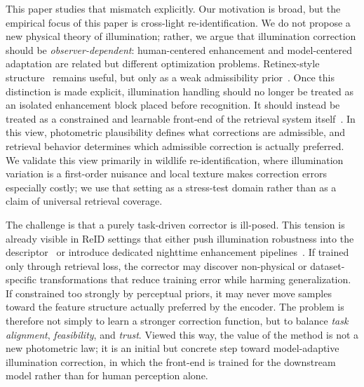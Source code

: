\documentclass[sigconf,screen,review,anonymous]{acmart}
\begin{document}
This paper studies that mismatch explicitly.
Our motivation is broad, but the empirical focus of this paper is
cross-light re-identification.
We do not propose a new physical theory of illumination; rather,
we argue that illumination correction should be \emph{observer-dependent}:
human-centered enhancement and model-centered adaptation are related but
different optimization problems.
Retinex-style structure~\cite{land1971lightness,land1977retinex} remains useful,
but only as a weak admissibility prior~\cite{wei2018retinexnet,wu2022uretinex,xu2022snraware,cai2023retinexformer,yi2023diffretinex,wang2024quadprior}.
Once this distinction is made explicit, illumination handling should no longer
be treated as an isolated enhancement block placed before recognition.
It should instead be treated as a constrained and learnable front-end of the
retrieval system itself~\cite{lengyel2021physicsprior,liu2022imageadaptive,hashmi2023featenhancer,wu2023semanticaware,luo2023simminmax,du2024daynight,wang2024motdark}.
In this view, photometric plausibility defines what
corrections are admissible, and retrieval behavior determines which admissible
correction is actually preferred.
We validate this view primarily in wildlife re-identification, where
illumination variation is a first-order nuisance and local texture makes
correction errors especially costly; we use that setting as a stress-test
domain rather than as a claim of universal retrieval coverage.

The challenge is that a purely task-driven corrector is ill-posed.
This tension is already visible in ReID settings that either push
illumination robustness into the descriptor~\cite{huang2019illumination,xu2020blackreid,yang2020contour,xiang2022rethinking,li2024dnvehicle}
or introduce dedicated nighttime enhancement pipelines~\cite{lu2024illuminationdistillation,lu2025nighttime}.
If trained only through retrieval loss, the corrector may discover non-physical or
dataset-specific transformations that reduce training error while harming
generalization.
If constrained too strongly by perceptual priors, it may never move samples
toward the feature structure actually preferred by the encoder.
The problem is therefore not simply to learn a stronger correction function,
but to balance \emph{task alignment}, \emph{feasibility}, and \emph{trust}.
Viewed this way, the value of the method is not a new photometric law; it is
an initial but concrete step toward model-adaptive illumination correction, in
which the front-end is trained for the downstream model rather than for human
perception alone.
\end{document}
